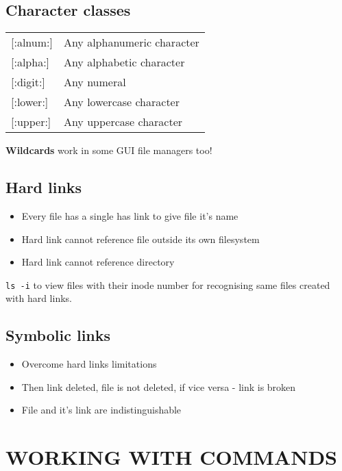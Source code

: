 \documentclass[8pt]{extarticle}
\begin{document}
\begin{multicols}{2}
\subsection{Character classes}
\begin{tabular}{ll}
{[:alnum:]}& Any alphanumeric character\\
{[:alpha:]} & Any alphabetic character\\
{[:digit:]} & Any numeral\\
{[:lower:]} & Any lowercase character\\
{[:upper:]} & Any uppercase character\\
\end{tabular}

\textbf{Wildcards} work in some GUI file managers too!

\subsection{Hard links}
\begin{itemize}
	\item Every file has a single has link to give file it's name
	\item Hard link cannot reference file outside its own filesystem
	\item Hard link cannot reference directory
\end{itemize}

\texttt{ls -i} to view files with their inode number for recognising same files created with hard links.

\subsection{Symbolic links}
\begin{itemize}
	\item Overcome hard links limitations
	\item Then link deleted, file is not deleted, if vice versa - link is broken
	\item File and it's link are indistinguishable
\end{itemize}

\section{WORKING WITH COMMANDS}


\end{multicols}
\end{document}
